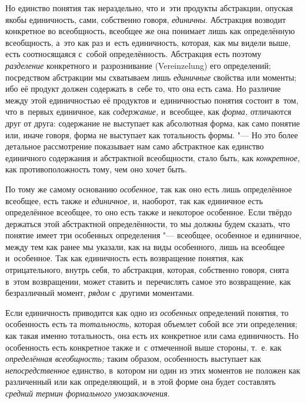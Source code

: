 Но единство понятия так нераздельно, что и~эти продукты абстракции,
опуская якобы единичность, сами, собственно говоря, {\em единичны}.
Абстракция возводит конкретное во всеобщность, всеобщее же
она понимает лишь как определённую всеобщность, а~это как раз и~есть
единичность, которая, как мы видели выше, есть соотносящаяся с~собой
определённость. Абстракция есть поэтому {\em разделение}
конкретного и~разрознивание (Verein\-zelung) его
определений; посредством абстракции мы схватываем лишь
{\em единичные} свойства
или моменты; ибо её продукт должен содержать в~себе то, что она есть сама.
Но различие между этой единичностью её продуктов и~единичностью понятия
состоит в~том, что в~первых единичное, как
{\em содержание,} и~всеобщее, как {\em форма,}
отличаются друг от друга: содержание не выступает как
абсолютная форма, как само понятие или, иначе говоря, форма не выступает
как тотальность формы. "--- Но это более детальное рассмотрение
показывает нам само абстрактное как единство единичного содержания и
абстрактной всеобщности, стало быть, как
{\em конкретное,} как противоположность тому, чем оно хочет быть.

По тому же самому основанию {\em особенное,} так как
оно есть лишь определённое всеобщее, есть также и {\em единичное,} и,
наоборот, так как единичное есть определённое всеобщее, то оно есть также и
некоторое особенное. Если твёрдо держаться этой абстрактной определённости,
то мы должны будем сказать, что понятие имеет три особенных
определения "--- всеобщее, особенное и
единичное, между тем как ранее мы указали, как на виды особенного, лишь на
всеобщее и~особенное. Так как единичность есть возвращение понятия, как
отрицательного, внутрь себя, то абстракция, которая, собственно говоря,
снята в~этом возвращении, может ставить и~перечислять самое это
возвращение, как безразличный момент, {\em рядом} с~другими моментами.

Если единичность приводится как одно из {\em особенных}
определений понятия, то особенность есть та {\em тотальность,}
которая объемлет собой все эти определения; как такая именно
тотальность, она есть их конкретное или сама единичность. Но особенность
есть конкретное также и~с отмеченной выше стороны, т.~е. как
{\em определённая всеобщность;}
таким образом, особенность выступает как {\em непосредственное}
единство, в~котором ни один из этих моментов не положен как
различенный или как определяющий, и~в этой форме она будет составлять
{\em средний термин формального умозаключения}.

